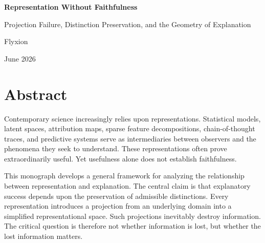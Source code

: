 \documentclass[11pt,oneside,openany]{book}
\title{ Representation Without Faithfulness\[1em] \Large Projection Failure, Distinction Preservation,\ and the Geometry of Explanation }
\author{Flyxion} \date{June 2026}
\begin{document}

\begin{titlepage}

\centering

\vspace*{2cm}

{\Huge\bfseries Representation Without Faithfulness \par}

\vspace{1cm}

{\Large Projection Failure, Distinction Preservation, and the Geometry of Explanation \par}

\vfill

{\Large Flyxion \par}

\vspace{1cm}

{\large June 2026 \par}

\vfill

\end{titlepage}


\frontmatter

\chapter*{Abstract} 


Contemporary science increasingly relies upon representations. Statistical models, latent spaces, attribution maps, sparse feature decompositions, chain-of-thought traces, and predictive systems serve as intermediaries between observers and the phenomena they seek to understand. These representations often prove extraordinarily useful. Yet usefulness alone does not establish faithfulness.

This monograph develops a general framework for analyzing the relationship between representation and explanation. The central claim is that explanatory success depends upon the preservation of admissible distinctions. Every representation introduces a projection from an underlying domain into a simplified representational space. Such projections inevitably destroy information. The critical question is therefore not whether information is lost, but whether the lost information matters.
\end{document}
